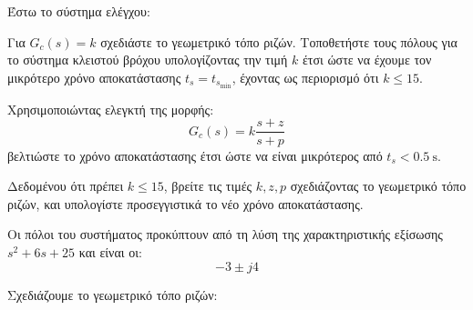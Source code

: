 \documentclass[11pt,a4paper,notitlepage,fleqn,final]{article}
\begin{document}
\begin{exercise}
Έστω το σύστημα ελέγχου:


\begin{enumlatin}
	\item Για \( G_c(s) = k \) σχεδιάστε το γεωμετρικό τόπο ριζών. Τοποθετήστε τους πόλους
	για το σύστημα κλειστού βρόχου υπολογίζοντας την τιμή \( k \) έτσι ώστε να έχουμε
	τον μικρότερο χρόνο αποκατάστασης \( t_s = t_{s_{\min}} \), έχοντας ως περιορισμό
	ότι \( k \leq 15 \).
	\item Χρησιμοποιώντας ελεγκτή της μορφής:
	\[
	G_c(s) = k\frac{s+z}{s+p}
	\]
	βελτιώστε το χρόνο αποκατάστασης έτσι ώστε να είναι μικρότερος από \( t_s < \SI{0.5}{\second} \).
	
	Δεδομένου ότι πρέπει \( k \leq 15 \), βρείτε τις τιμές \( k,z,p  \) σχεδιάζοντας το
	γεωμετρικό τόπο ριζών, και υπολογίστε προσεγγιστικά το νέο χρόνο αποκατάστασης.
\end{enumlatin}

\tcblower
\begin{enumlatin}
	\item
Οι πόλοι του συστήματος προκύπτουν από τη λύση της χαρακτηριστικής εξίσωσης \( s^2+6s+25 \)
και είναι οι:
\[
-3\pm j4
\]

Σχεδιάζουμε το γεωμετρικό τόπο ριζών:

\end{enumlatin}
\end{exercise}
\end{document}

